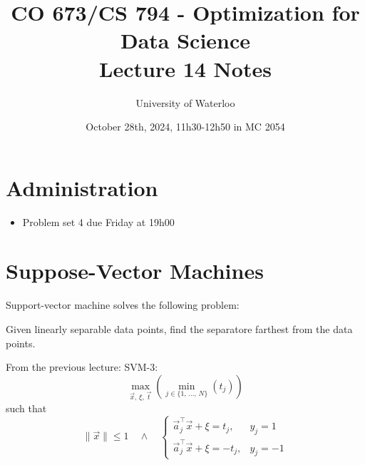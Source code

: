 \documentclass{article}
\title{CO 673/CS 794 - Optimization for Data Science\\Lecture 14 Notes}
\author{University of Waterloo}
\date{October 28th, 2024, 11h30-12h50 in MC 2054}
\begin{document}
\maketitle

\section{Administration}

\begin{itemize}
    \item Problem set 4 due Friday at 19h00
\end{itemize}

\section{Suppose-Vector Machines}

Support-vector machine solves the following problem:

Given linearly separable data points, find the separatore farthest from the data points.

From the previous lecture: SVM-3:
\[
    \max_{\vec{x},\, \xi,\, \vec{t}}\left(\min_{j \in \{1,\, \ldots,\, N\}}\left(t_j\right)\right)
\]
such that
\[
    \|\vec{x}\| \leq 1 \quad \wedge \quad \begin{cases}
        \vec{a}_j^\top \vec{x} + \xi = t_j, & y_j = 1 \\
        \vec{a}_j^\top \vec{x} + \xi = -t_j, & y_j = -1
    \end{cases}
\]
\end{document}
